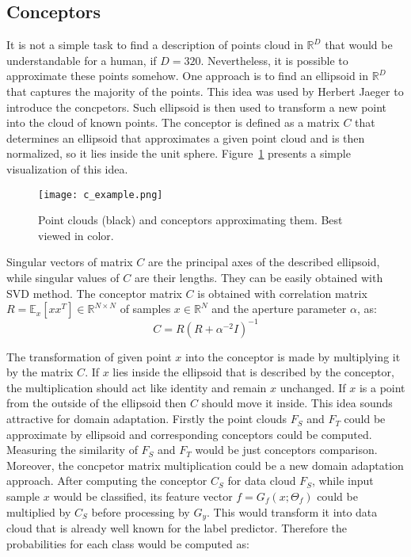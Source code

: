 \documentclass{article}
\begin{document}
\subsection{Conceptors}
It is not a simple task to find a description of points cloud in $\mathbb{R}^{D}$ that would be understandable for a human, if $D = 320$. Nevertheless, it is possible to approximate these points somehow. One approach is to find an ellipsoid in $\mathbb{R}^{D}$ that captures the majority of the points. This idea was used by Herbert Jaeger to introduce the concpetors. Such ellipsoid is then used to transform a new point into the cloud of known points. The conceptor is defined as a matrix $C$ that determines an ellipsoid that approximates a given point cloud and is then normalized, so it lies inside the unit sphere. Figure~\ref{fig:conceptor_intro} presents a simple visualization of this idea.
\begin{figure}%
    \centering
    \texttt{[image: c\_example.png]}%
    \caption{Point clouds (black) and conceptors approximating them. Best viewed in color.}
    \label{fig:conceptor_intro}%
\end{figure}
Singular vectors of matrix $C$ are the principal axes of the described ellipsoid, while singular values of $C$ are their lengths. They can be easily obtained with SVD method. The conceptor matrix $C$ is obtained with correlation matrix $R = \mathbb{E}_{x}[xx^{T}] \in \mathbb{R}^{N\times N}$ of samples $x \in \mathbb{R}^{N}$ and the aperture parameter $\alpha$, as:
\begin{equation*}
    C = R(R + \alpha^{-2} I)^{-1}
\end{equation*}
\par
The transformation of given point $x$ into the conceptor is made by multiplying it by the matrix $C$. If $x$ lies inside the ellipsoid that is described by the conceptor, the multiplication should act like identity and remain $x$ unchanged. If $x$ is a point from the outside of the ellipsoid then $C$ should move it inside. This idea sounds attractive for domain adaptation. Firstly the point clouds $F_{S}$ and $F_{T}$ could be approximate by ellipsoid and corresponding conceptors could be computed. Measuring the similarity of $F_{S}$ and $F_{T}$ would be just conceptors comparison. Moreover, the concpetor matrix multiplication could be a new domain adaptation approach. After computing the conceptor $C_{S}$ for data cloud $F_{S}$, while input sample $x$ would be classified, its feature vector $f = G_{f}(x ; \Theta_{f})$ could be multiplied by $C_{S}$ before processing by $G_{y}$. This would transform it into data cloud that is already well known for the label predictor. Therefore the probabilities for each class would be computed as:
\end{document}
